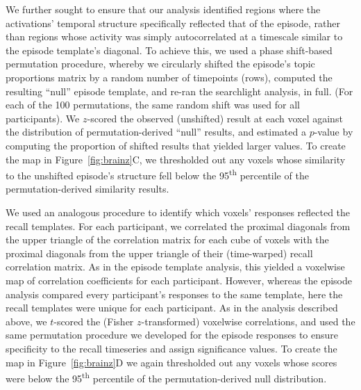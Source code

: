 \documentclass[10pt]{article}
\begin{document}
We further sought to ensure that our analysis identified regions where the activations’ temporal structure specifically reflected that of the episode, rather than regions whose activity was simply autocorrelated at a timescale similar to the episode template’s diagonal.  To achieve this, we used a phase shift-based permutation procedure, whereby we circularly shifted the episode’s topic proportions matrix by a random number of timepoints (rows), computed the resulting ``null'' episode template, and re-ran the searchlight analysis, in full.  (For each of the 100 permutations, the same random shift was used for all participants).  We $z$-scored the observed (unshifted) result at each voxel against the distribution of permutation-derived ``null'' results, and estimated a $p$-value by computing the proportion of shifted results that yielded larger values.  To create the map in Figure~\ref{fig:brainz}C, we thresholded out any voxels whose similarity to the unshifted episode’s structure fell below the 95\textsuperscript{th} percentile of the permutation-derived similarity results.

We used an analogous procedure to identify which voxels' responses reflected the recall templates.  For each participant, we correlated the proximal diagonals from the upper triangle of the correlation matrix for each cube of voxels with the proximal diagonals from the upper triangle of their (time-warped) recall correlation matrix.  As in the episode template analysis, this yielded a voxelwise map of correlation coefficients for each participant.  However, whereas the episode analysis compared every participant's responses to the same template, here the recall templates were unique for each participant.  As in the analysis described above, we $t$-scored the (Fisher $z$-transformed) voxelwise correlations, and used the same permutation procedure we developed for the episode responses to ensure specificity to the recall timeseries and assign significance values.  To create the map in Figure~\ref{fig:brainz}D we again thresholded out any voxels whose scores were below the 95\textsuperscript{th} percentile of the permutation-derived null distribution.
\end{document}
